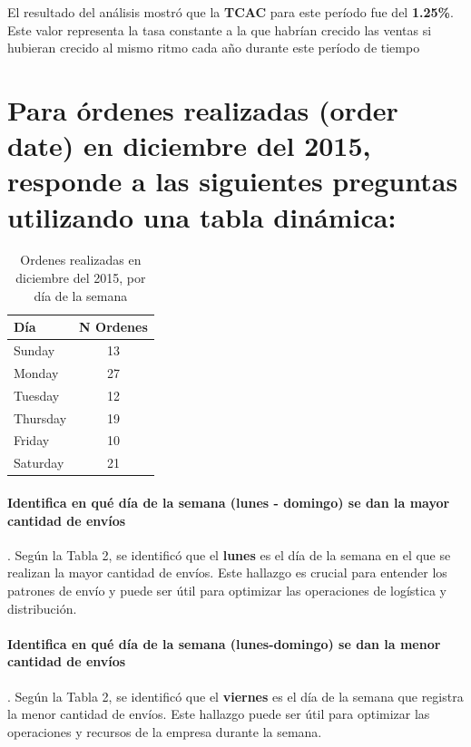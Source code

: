 \documentclass[10pt]{article}
\begin{document}
\begin{paracol}{2}
El resultado del análisis mostró que la \textbf{TCAC} para este período fue del \textbf{1.25\%}. Este valor representa la tasa constante a la que habrían crecido las ventas si hubieran crecido al mismo ritmo cada año durante este período de tiempo


\section{Para órdenes realizadas (order date) en diciembre del 2015, responde a las siguientes preguntas utilizando una tabla dinámica:}

\begin{table}[h]
    \centering
    \begin{tabular}{|l|c|}
	\hline
	\textbf{Día} & \textbf{N Ordenes} \\
	\hline
	Sunday & 13 \\
	\hline
	Monday & 27 \\
	\hline
	Tuesday & 12 \\
	\hline
	Thursday & 19 \\
	\hline
	Friday & 10 \\
	\hline
	Saturday & 21 \\
	\hline
    \end{tabular}
    \caption{Ordenes realizadas en diciembre del 2015, por día de la semana}
\end{table}


\paragraph{Identifica en qué día de la semana (lunes - domingo) se dan la mayor cantidad de envíos}.
Según la Tabla 2, se identificó que el \textbf{lunes} es el día de la semana en el que se realizan la mayor cantidad de envíos. Este hallazgo es crucial para entender los patrones de envío y puede ser útil para optimizar las operaciones de logística y distribución. 

\paragraph{Identifica en qué día de la semana (lunes-domingo) se dan la menor cantidad de envíos}.
Según la Tabla 2, se identificó que el \textbf{viernes} es el día de la semana que registra la menor cantidad de envíos. Este hallazgo puede ser útil para optimizar las operaciones y recursos de la empresa durante la semana. 

\end{paracol}



\end{document}
